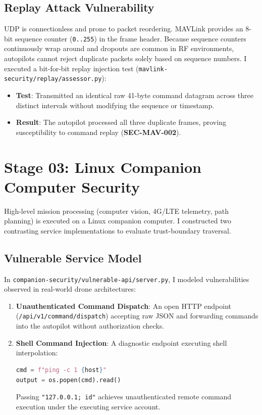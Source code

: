 \documentclass[11pt,a4paper]{article}
\begin{document}
\subsection{Replay Attack Vulnerability}
UDP is connectionless and prone to packet reordering. MAVLink provides an 8-bit sequence counter (\texttt{0..255}) in the frame header. Because sequence counters continuously wrap around and dropouts are common in RF environments, autopilots cannot reject duplicate packets solely based on sequence numbers.
I executed a bit-for-bit replay injection test (\texttt{mavlink-security/replay/assessor.py}):
\begin{itemize}
    \item \textbf{Test}: Transmitted an identical raw 41-byte command datagram across three distinct intervals without modifying the sequence or timestamp.
    \item \textbf{Result}: The autopilot processed all three duplicate frames, proving susceptibility to command replay (\textbf{SEC-MAV-002}).
\end{itemize}

\section{Stage 03: Linux Companion Computer Security}
High-level mission processing (computer vision, 4G/LTE telemetry, path planning) is executed on a Linux companion computer. I constructed two contrasting service implementations to evaluate trust-boundary traversal.

\subsection{Vulnerable Service Model}
In \texttt{companion-security/vulnerable-api/server.py}, I modeled vulnerabilities observed in real-world drone architectures:
\begin{enumerate}
    \item \textbf{Unauthenticated Command Dispatch}: An open HTTP endpoint (\texttt{/api/v1/command/dispatch}) accepting raw JSON and forwarding commands into the autopilot without authorization checks.
    \item \textbf{Shell Command Injection}: A diagnostic endpoint executing shell interpolation:
    \begin{lstlisting}[language=Python]
cmd = f"ping -c 1 {host}"
output = os.popen(cmd).read()
    \end{lstlisting}
    Passing \texttt{"127.0.0.1; id"} achieves unauthenticated remote command execution under the executing service account.
\end{enumerate}
\end{document}
